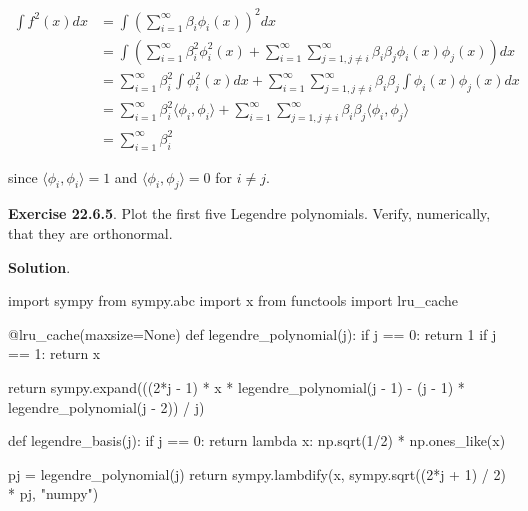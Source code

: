 \begin{align*}
\int f^{2}(x) dx &= \int \left( \sum_{i=1}^{\infty} \beta_{i} \phi_{i}(x) \right)^{2} dx \\
&= \int \left( \sum_{i=1}^{\infty} \beta_{i}^{2} \phi_{i}^{2}(x) + \sum_{i=1}^{\infty} \sum_{j=1, j \neq i}^{\infty} \beta_{i} \beta_{j} \phi_{i}(x) \phi_{j}(x) \right) dx \\
&= \sum_{i=1}^{\infty} \beta_{i}^{2} \int \phi_{i}^{2}(x) dx + \sum_{i=1}^{\infty} \sum_{j=1, j \neq i}^{\infty} \beta_{i} \beta_{j}  \int \phi_{i}(x) \phi_{j}(x) dx \\
&= \sum_{i=1}^{\infty} \beta_{i}^{2} \langle \phi_{i}, \phi_{i} \rangle + \sum_{i=1}^{\infty} \sum_{j=1, j \neq i}^{\infty} \beta_{i} \beta_{j} \langle \phi_{i}, \phi_{j} \rangle \\
&= \sum_{i=1}^{\infty} \beta_{i}^{2}
\end{align*}

since \(\langle \phi_{i}, \phi_{i} \rangle = 1\) and
\(\langle \phi_{i}, \phi_{j} \rangle = 0\) for \(i \neq j\).

\textbf{Exercise 22.6.5}. Plot the first five Legendre polynomials.
Verify, numerically, that they are orthonormal.

\textbf{Solution}.

\begin{python}
import sympy
from sympy.abc import x
from functools import lru_cache

@lru_cache(maxsize=None)
def legendre_polynomial(j):
    if j == 0:
        return 1
    if j == 1:
        return x
    
    return sympy.expand(((2*j - 1) * x * legendre_polynomial(j - 1) - (j - 1) * legendre_polynomial(j - 2)) / j)

def legendre_basis(j):
    if j == 0:
        return lambda x: np.sqrt(1/2) * np.ones_like(x)
    
    pj = legendre_polynomial(j)
    return sympy.lambdify(x, sympy.sqrt((2*j + 1) / 2) * pj, "numpy")
\end{python}



